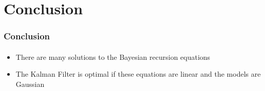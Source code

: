 \documentclass{beamer}
\begin{document}
\section{Conclusion}
\begin{frame}
\frametitle{Conclusion}
\mypagenum
\framesubtitle{}
\begin{itemize}
\item There are many solutions to the Bayesian recursion equations
\item The Kalman Filter is optimal if these equations are linear and the models are Gaussian
\end{itemize}
\end{frame}





\end{document}
